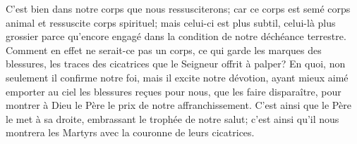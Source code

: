 C’est bien dans notre corps que nous ressusciterons;
	car ce corps est semé corps animal et ressuscite corps spirituel;
	mais celui-ci est plus subtil, celui-là plus grossier
	parce qu’encore engagé dans la condition de notre déchéance terrestre.
Comment en effet ne serait-ce pas un corps,
	ce qui garde les marques des blessures,
	les traces des cicatrices que le Seigneur offrit à palper?
En quoi, non seulement il confirme notre foi, mais il excite notre dévotion,
	ayant mieux aimé emporter au ciel les blessures reçues pour nous,
	que les faire disparaître,
	pour montrer à Dieu le Père le prix de notre affranchissement.
C’est ainsi que le Père le met à sa droite,
	embrassant le trophée de notre salut;
	c’est ainsi qu’il nous montrera les Martyrs
		avec la couronne de leurs cicatrices.
